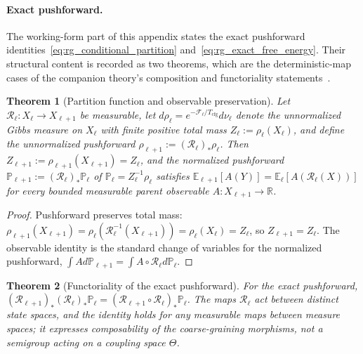 \documentclass[11pt]{article}
\newtheorem{theorem}{Theorem}
\begin{document}
\paragraph{Exact pushforward.}
The working-form part of this appendix states the exact pushforward identities~\eqref{eq:rg_conditional_partition} and~\eqref{eq:rg_exact_free_energy}. Their structural content is recorded as two theorems, which are the deterministic-map cases of the companion theory's composition and functoriality statements~\cite[Chs.~9 and 11]{DennisGaugeVFE2026}.

\begin{theorem}[Partition function and observable preservation]
\label{thm:rg_pushforward}
Let $\mathcal{R}_\ell : X_\ell \to X_{\ell+1}$ be measurable, let $d\rho_\ell = e^{-\mathcal{F}_\ell/T_{\mathrm{cfg}}}d\nu_\ell$ denote the unnormalized Gibbs measure on $X_\ell$ with finite positive total mass $Z_\ell := \rho_\ell(X_\ell)$, and define the unnormalized pushforward $\rho_{\ell+1} := (\mathcal{R}_\ell)_*\rho_\ell$. Then $Z_{\ell+1} := \rho_{\ell+1}(X_{\ell+1}) = Z_\ell$, and the normalized pushforward $\mathbb{P}_{\ell+1} := (\mathcal{R}_\ell)_*\mathbb{P}_\ell$ of $\mathbb{P}_\ell = Z_\ell^{-1}\rho_\ell$ satisfies $\mathbb{E}_{\ell+1}[A(Y)] = \mathbb{E}_\ell[A(\mathcal{R}_\ell(X))]$ for every bounded measurable parent observable $A : X_{\ell+1} \to \mathbb{R}$.
\end{theorem}

\begin{proof}
Pushforward preserves total mass: $\rho_{\ell+1}(X_{\ell+1}) = \rho_\ell(\mathcal{R}_\ell^{-1}(X_{\ell+1})) = \rho_\ell(X_\ell) = Z_\ell$, so $Z_{\ell+1} = Z_\ell$. The observable identity is the standard change of variables for the normalized pushforward, $\int A  d\mathbb{P}_{\ell+1} = \int A\circ\mathcal{R}_\ell  d\mathbb{P}_\ell$.
\end{proof}

\begin{theorem}[Functoriality of the exact pushforward]
\label{thm:rg_semigroup}
For the exact pushforward, $(\mathcal{R}_{\ell+1})_*(\mathcal{R}_\ell)_*\mathbb{P}_\ell = (\mathcal{R}_{\ell+1} \circ \mathcal{R}_\ell)_*\mathbb{P}_\ell$. The maps $\mathcal{R}_\ell$ act between distinct state spaces, and the identity holds for any measurable maps between measure spaces; it expresses composability of the coarse-graining morphisms, not a semigroup acting on a coupling space $\Theta$.
\end{theorem}
\end{document}
